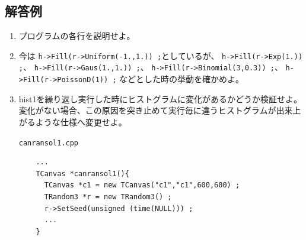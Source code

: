   \subsection{解答例}

  \begin{enumerate}

   \item プログラムの各行を説明せよ。

   \item 今は
	 \verb|h->Fill(r->Uniform(-1.,1.)) ;|としているが、
	 \verb|h->Fill(r->Exp(1.)) ;|、
	 \verb|h->Fill(r->Gaus(1.,1.)) ;|、
	 \verb|h->Fill(r->Binomial(3,0.3)) ;|、
	 \verb|h->Fill(r->PoissonD(1)) ;|
	 などとした時の挙動を確かめよ。

   \item hist1を繰り返し実行した時にヒストグラムに変化があるかどうか検証せよ。
	 変化がない場合、この原因を突き止めて実行毎に違うヒストグラムが出来上がるような仕様へ変更せよ。
	 \begin{itembox}{\texttt{canransol1.cpp}}
\begin{verbatim}
	...
	TCanvas *canransol1(){
	  TCanvas *c1 = new TCanvas("c1","c1",600,600) ;
	  TRandom3 *r = new TRandom3() ;
	  r->SetSeed(unsigned (time(NULL))) ;
	  ...
	}
\end{verbatim}
	 \end{itembox}

  \end{enumerate}
